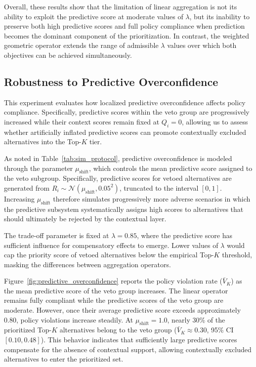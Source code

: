 \documentclass[mathematics,article,submit,moreauthors]{Definitions/mdpi}
\begin{document}
Overall, these results show that the limitation of linear aggregation is not its ability to exploit the predictive score at moderate values of $\lambda$, but its inability to preserve both high predictive scores and full policy compliance when prediction becomes the dominant component of the prioritization. In contrast, the weighted geometric operator extends the range of admissible $\lambda$ values over which both objectives can be achieved simultaneously.

\subsection{Robustness to Predictive Overconfidence}
\label{subsect:firewall}

This experiment evaluates how localized predictive overconfidence affects policy compliance. Specifically, predictive scores within the veto group are progressively increased while their context scores remain fixed at $Q_i=0$, allowing us to assess whether artificially inflated predictive scores can promote contextually excluded alternatives into the Top-$K$ tier. 


{\color{blue} As noted in Table~\ref{tab:sim_protocol}, predictive overconfidence is modeled through the parameter $\mu_{\text{shift}}$, which controls the mean predictive score assigned to the veto subgroup. Specifically, predictive scores for vetoed alternatives are generated from $R_i \sim \mathcal{N}(\mu_{\text{shift}},0.05^2)$,
truncated to the interval $[0,1]$. Increasing $\mu_{\text{shift}}$ therefore simulates progressively more adverse scenarios in which the predictive subsystem systematically assigns high scores to alternatives that should ultimately be rejected by the contextual layer.}

The trade-off parameter is fixed at $\lambda=0.85$, where the predictive score has sufficient influence for compensatory effects to emerge. Lower values of $\lambda$ would cap the priority score of vetoed alternatives below the empirical Top-$K$ threshold, masking the differences between aggregation operators.

Figure~\ref{fig:predictive_overconfidence} reports the policy violation rate ($\bar{V}_K$) as the mean predictive score of the veto group increases.
The linear operator remains fully compliant while the predictive scores of the veto group are moderate. However, once their average predictive score exceeds approximately $0.80$, policy violations increase steadily. At $\mu_{\text{shift}}=1.0$, nearly 30\% of the prioritized Top-$K$ alternatives belong to the veto group ($\bar{V}_K\approx0.30$, 95\% CI $[0.10,0.48]$). This behavior indicates that sufficiently large predictive scores compensate for the absence of contextual support, allowing contextually excluded alternatives to enter the prioritized set.
\end{document}
